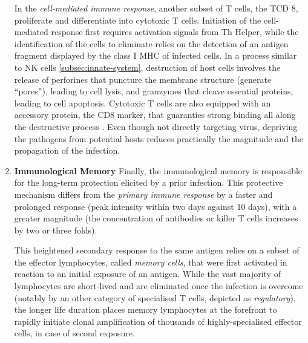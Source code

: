 \begin{enumerate}[label=(\alph*)]
In the \emph{cell-mediated immune response}, another subset of T cells, the TCD 8, proliferate and differentiate into cytotoxic T cells. Initiation of the cell-mediated response first requires activation signals from Th Helper, while the identification of the cells to eliminate relies on the detection of an antigen fragment displayed by the class I MHC of infected cells. In a process similar to NK cells \ref{subsec:innate-system}, destruction of host cells involves the release of perforines that puncture the membrane structure (generate \enquote{pores}), leading to cell lysis, and granzymes that cleave essential proteins, leading to cell apoptosis. Cytotoxic T cells are also equipped with an accessory protein, the CD8 marker, that guaranties strong binding all along the destructive process \autocite[Figure 22, Chapter 43]{campbell_etal20}. Even though not directly targeting virus, depriving the pathogens from potential hosts reduces practically the magnitude and the propagation of the infection. 



\item \textbf{Immunological Memory} 
Finally, the immunological memory is responsible for the long-term protection elicited by a prior infection. This protective mechanism differs from the \emph{primary immune response} by a faster and prolonged response (peak intensity within two days against 10 days), with a greater magnitude (the concentration of antibodies or killer T cells increases by two or three folds). 

This heightened secondary response to the same antigen relies on a subset of the effector lymphocytes, called \emph{memory cells}, that were first activated in reaction to an initial exposure of an antigen. While the vast majority of lymphocytes are short-lived and are eliminated once the infection is overcome (notably by an other category of specialised T cells, depicted as \emph{regulatory}), the longer life duration places memory lymphocytes at the forefront to rapidly initiate clonal amplification of thousands of highly-specialised effector cells, in case of second exposure. 


\end{enumerate}

